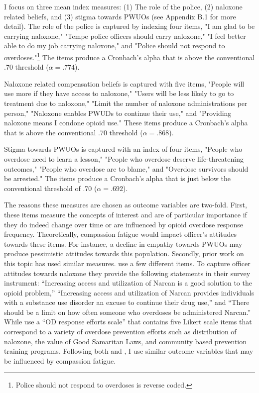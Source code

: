 I focus on three mean index measures: (1) The role of the police, (2) naloxone related beliefs, and (3) stigma towards PWUOs (see Appendix B.1 for more detail). The role of the police is captured by indexing four items, "I am glad to be carrying naloxone," "Tempe police officers should carry naloxone," "I feel better able to do my job carrying naloxone," and "Police should not respond to overdoses."\footnote{Police should not respond to overdoses is reverse coded.} The items produce a Cronbach's alpha that is above the conventional .70 threshold (\(\alpha = .774\)).

Naloxone related compensation beliefs is captured with five items, "People will use more if they have access to naloxone," "Users will be less likely to go to treatment due to naloxone," "Limit the number of naloxone administrations per person," "Naloxone enables PWUDs to continue their use," and "Providing naloxone means I condone opioid use." These items produce a Cronbach's alpha that is above the conventional .70 threshold (\(\alpha = .868\)).

Stigma towards PWUOs is captured with an index of four items, "People who overdose need to learn a lesson," "People who overdose deserve life-threatening outcomes," "People who overdose are to blame," and "Overdose survivors should be arrested." The items produce a Cronbach's alpha that is just below the conventional threshold of .70 (\(\alpha = .692\)).

The reasons these measures are chosen as outcome variables are two-fold. First, these items measure the concepts of interest and are of particular importance if they do indeed change over time or are influenced by opioid overdose response frequency. Theoretically, compassion fatigue would impact officer's attitudes towards these items. For instance, a decline in empathy towards PWUOs may produce pessimistic attitudes towards this population. Secondly, prior work on this topic has used similar measures. \textcite{murphy_police_2020} use a few different items. To capture officer attitudes towards naloxone they provide the following statements in their survey instrument: “Increasing access and utilization of Narcan is a good solution to the opioid problem,” “Increasing access and utilization of Narcan provides individuals with a substance use disorder an excuse to continue their drug use,” and “There should be a limit on how often someone who overdoses be administered Narcan.” While \textcite{carroll_knowledge_2020} use a “OD response efforts scale” that contains five Likert scale items that correspond to a variety of overdose prevention efforts such as distribution of naloxone, the value of Good Samaritan Laws, and community based prevention training programs. Following both \textcite{murphy_police_2020} and \textcite{carroll_knowledge_2020}, I use similar outcome variables that may be influenced by compassion fatigue. 


